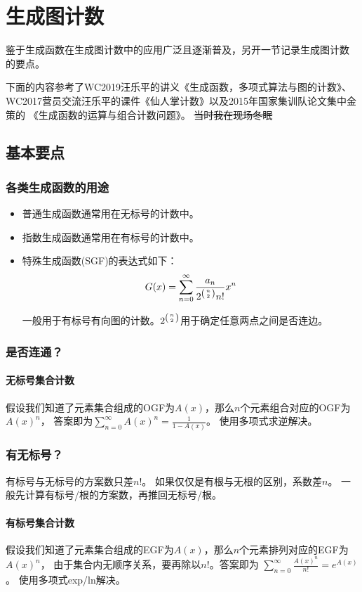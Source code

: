 \section{生成图计数}
鉴于生成函数在生成图计数中的应用广泛且逐渐普及，另开一节记录生成图计数
的要点。

下面的内容参考了WC2019汪乐平的讲义《生成函数，多项式算法与图的计数》、
WC2017营员交流汪乐平的课件《仙人掌计数》以及2015年国家集训队论文集中金策的
《生成函数的运算与组合计数问题》。
\sout{当时我在现场冬眠}
\subsection{基本要点}
\subsubsection{各类生成函数的用途}
\begin{itemize}
    \item 普通生成函数通常用在无标号的计数中。
    \item 指数生成函数通常用在有标号的计数中。
    \item 特殊生成函数(SGF)的表达式如下：
    \begin{displaymath}
        G(x)=\sum_{n=0}^\infty{\frac{a_n}{2^{\left(n \atop 2\right)}n!}x^n}
    \end{displaymath}

    一般用于有标号有向图的计数。$2^{\left(n \atop 2\right)}$用于确定任意两点之间是否连边。
\end{itemize}
\subsubsection{是否连通？}
\paragraph{无标号集合计数}
假设我们知道了元素集合组成的OGF为$A(x)$，那么$n$个元素组合对应的OGF为$A(x)^n$，
答案即为$\displaystyle \sum_{n=0}^\infty{A(x)^n}=\frac{1}{1-A(x)}$。
使用多项式求逆解决。
\subsubsection{有无标号？}
有标号与无标号的方案数只差$n!$。
如果仅仅是有根与无根的区别，系数差$n$。
一般先计算有标号/根的方案数，再推回无标号/根。
\paragraph{有标号集合计数}
假设我们知道了元素集合组成的EGF为$A(x)$，那么$n$个元素排列对应的EGF为$A(x)^n$，
由于集合内无顺序关系，要再除以$n!$。答案即为
$\displaystyle \sum_{n=0}^\infty{\frac{A(x)^n}{n!}}=e^{A(x)}$。
使用多项式exp/ln解决。
